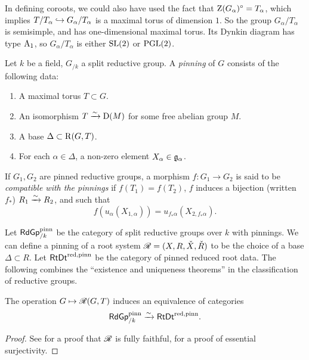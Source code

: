 In defining coroots, we could also have used the fact that 
$\operatorname{Z}(G_\alpha)^\circ=T_\alpha$, which implies 
$T/T_\alpha\hookrightarrow G_\alpha/T_\alpha$ is a maximal torus of dimension $1$. So 
the group $G_\alpha/T_\alpha$ is semisimple, and has one-dimensional maximal 
torus. Its Dynkin diagram has type $\mathrm{A}_1$, so $G_\alpha/T_\alpha$ is either 
$\operatorname{SL}(2)$ or $\operatorname{PGL}(2)$. 

\begin{definition}
Let $k$ be a field, $G_{/k}$ a split reductive group. A \emph{pinning} of $G$ 
consists of the following data:
\begin{enumerate}
  \item A maximal torus $T\subset G$. 
  \item An isomorphism $T\xrightarrow\sim \operatorname{D}(M)$ for some free abelian group $M$. 
  \item A base $\Delta\subset \operatorname{R}(G,T)$. 
  \item For each $\alpha\in \Delta$, a non-zero element 
    $X_\alpha\in \mathfrak{g}_\alpha$. 
\end{enumerate}
\end{definition}

If $G_1,G_2$ are pinned reductive groups, a morphism $f:G_1\to G_2$ is said to 
be \emph{compatible with the pinnings} if $f(T_1)=f(T_2)$, $f$ induces a 
bijection (written $f_\ast$) $R_1\xrightarrow\sim R_2$, and such that 
\[
  f(u_\alpha(X_{1,\alpha})) = u_{f_\ast\alpha}(X_{2,f_\ast\alpha}) .
\]

Let $\mathsf{RdGp}_{/k}^\mathrm{pinn}$ be the category of split reductive 
groups over $k$ with pinnings. We can define a pinning of a root system 
$\mathscr{R}=(X,R,\check X,\check R)$ to be the choice of a base $\Delta\subset R$. Let 
$\mathsf{RtDt}^\mathrm{red,pinn}$ be the category of pinned reduced root data. The 
following combines the ``existence and uniqueness theorems'' in the 
classification of reductive groups. 

\begin{theorem}\label{thm:reductive-classification}
The operation $G\mapsto \mathscr{R}(G,T)$ induces an equivalence of categories 
\[
  \mathsf{RdGp}_{/k}^\mathrm{pinn}\xrightarrow\sim \mathsf{RtDt}^\mathrm{red,pinn} .
\]
\end{theorem}
\begin{proof}
See \cite[XXIII 4.1]{sga3-iii} for a proof that $\mathscr{R}$ is fully faithful, 
\cite[XXV 2]{sga3-iii} for a proof of essential surjectivity. 
\end{proof}





